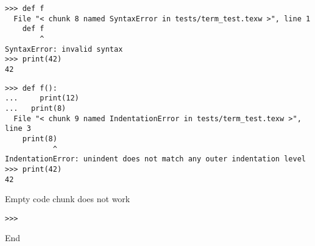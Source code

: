 \begin{verbatim}
>>> def f
  File "< chunk 8 named SyntaxError in tests/term_test.texw >", line 1
    def f
        ^
SyntaxError: invalid syntax
>>> print(42)
42

\end{verbatim}


\begin{verbatim}
>>> def f():
...     print(12)
...   print(8)
  File "< chunk 9 named IndentationError in tests/term_test.texw >",
line 3
    print(8)
           ^
IndentationError: unindent does not match any outer indentation level
>>> print(42)
42

\end{verbatim}

Empty code chunk does not work

\begin{verbatim}
>>>

\end{verbatim}

End

